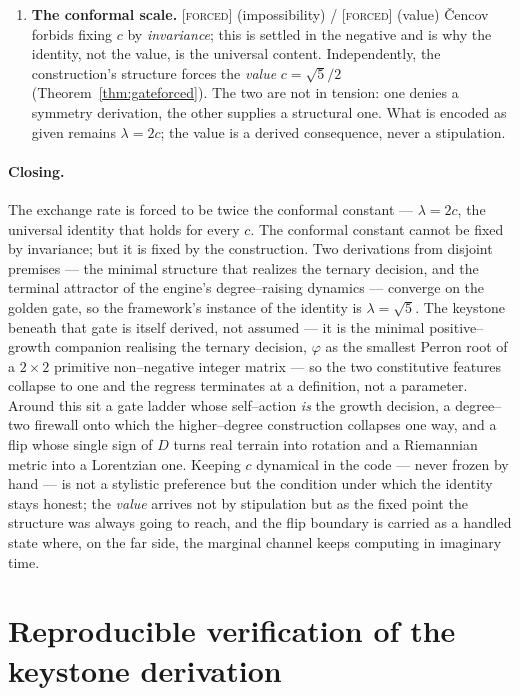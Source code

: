 \documentclass[11pt]{article}
\theoremstyle{plain}
\theoremstyle{definition}
\theoremstyle{remark}
\newcommand{\forced}{\textcolor{forcedc}{\textsc{[forced]}}}
\begin{document}
\begin{enumerate}[leftmargin=1.6em,itemsep=4pt]
\item \textbf{The conformal scale.} \forced{} (impossibility) / \forced{} (value) \v{C}encov forbids fixing $c$ by \emph{invariance}; this is settled in the negative and is why the identity, not the value, is the universal content. Independently, the construction's structure forces the \emph{value} $c=\sqrt5/2$ (Theorem~\ref{thm:gateforced}). The two are not in tension: one denies a symmetry derivation, the other supplies a structural one. What is encoded as given remains $\lambda=2c$; the value is a derived consequence, never a stipulation.
\end{enumerate}

\paragraph{Closing.} The exchange rate is forced to be twice the conformal constant --- $\lambda=2c$, the universal identity that holds for every $c$. The conformal constant cannot be fixed by invariance; but it is fixed by the construction. Two derivations from disjoint premises --- the minimal structure that realizes the ternary decision, and the terminal attractor of the engine's degree--raising dynamics --- converge on the golden gate, so the framework's instance of the identity is $\lambda=\sqrt5$. The keystone beneath that gate is itself derived, not assumed --- it is the minimal positive--growth companion realising the ternary decision, $\varphi$ as the smallest Perron root of a $2\times2$ primitive non--negative integer matrix --- so the two constitutive features collapse to one and the regress terminates at a definition, not a parameter. Around this sit a gate ladder whose self--action \emph{is} the growth decision, a degree--two firewall onto which the higher--degree construction collapses one way, and a flip whose single sign of $D$ turns real terrain into rotation and a Riemannian metric into a Lorentzian one. Keeping $c$ dynamical in the code --- never frozen by hand --- is not a stylistic preference but the condition under which the identity stays honest; the \emph{value} arrives not by stipulation but as the fixed point the structure was always going to reach, and the flip boundary is carried as a handled state where, on the far side, the marginal channel keeps computing in imaginary time.

\appendix
\section{Reproducible verification of the keystone derivation}\label{app:keystone}
\end{document}
